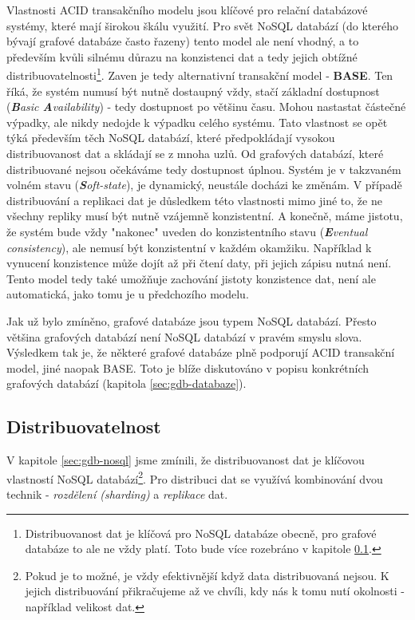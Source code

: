 Vlastnosti ACID transakčního modelu jsou klíčové pro relační databázové systémy, které mají širokou škálu využití. Pro svět NoSQL databází (do kterého bývají grafové databáze často řazeny) tento model ale není vhodný, a to především kvůli silnému důrazu na konzistenci dat a tedy jejich obtížné distribuovatelnosti\footnote{Distribuovanost dat je klíčová pro NoSQL databáze obecně, pro grafové databáze to ale ne vždy platí. Toto bude více rozebráno v kapitole \ref{sec:gdb-distribution}.}. Zaven je tedy alternativní transakční model - \textbf{BASE}. Ten říká, že systém numusí být nutně dostaupný vždy, stačí základní dostupnost (\textit{\textbf{B}asic \textbf{A}vailability}) - tedy dostupnost po většinu času. Mohou nastastat částečné výpadky, ale nikdy nedojde k výpadku celého systému. Tato vlastnost se opět týká především těch NoSQL databází, které předpokládají vysokou distribuovanost dat a skládají se z mnoha uzlů. Od grafových databází, které distribuované nejsou očekáváme tedy dostupnost úplnou. Systém je v takzvaném volném stavu (\textit{\textbf{S}oft-state}), je dynamický, neustále docházi ke změnám. V případě distribuování a replikaci dat je důsledkem této vlastnosti mimo jiné to, že ne všechny repliky musí být nutně vzájemně konzistentní. A konečně, máme jistotu, že systém bude vždy "nakonec" uveden do konzistentního stavu (\textit{\textbf{E}ventual consistency}), ale nemusí být konzistentní v každém okamžiku. Například k vynucení konzistence může dojít až při čtení daty, při jejich zápisu nutná není. Tento model tedy také umožňuje zachování jistoty konzistence dat, není ale automatická, jako tomu je u předchozího modelu. \cite{Sadalage13}

Jak už bylo zmíněno, grafové databáze jsou typem NoSQL databází. Přesto většina grafových databází není NoSQL databází v pravém smyslu slova. Výsledkem tak je, že některé grafové databáze plně podporují ACID transakční model, jiné naopak BASE. Toto je blíže diskutováno v popisu konkrétních grafových databází (kapitola \ref{sec:gdb-databaze}).



\subsection{Distribuovatelnost}
\label{sec:gdb-distribution}
V kapitole \ref{sec:gdb-nosql} jsme zmínili, že distribuovanost dat je klíčovou vlastností NoSQL databází\footnote{Pokud je to možné, je vždy efektivnější když data distribuovaná nejsou. K jejich distribuování přikračujeme až ve chvíli, kdy nás k tomu nutí okolnosti - například velikost dat.}. Pro distribuci dat se využívá kombinování dvou technik - \textit{rozdělení (sharding)} a \textit{replikace} dat. 

